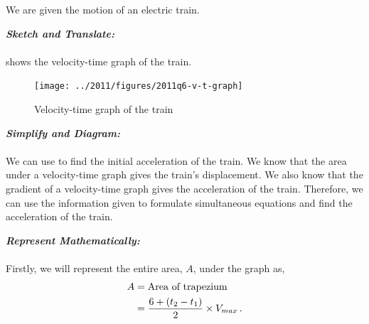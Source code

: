 %
%
%


\begin{subquestions}
	
\subquestion
We are given the motion of an electric train.

\begin{subsubquestions}
	
\subsubquestion

\textbf{\textit{Sketch and Translate:}} \\ \\
 shows the velocity-time graph of the train.
\begin{figure}[H]
	\begin{center}
		\texttt{[image: ../2011/figures/2011q6-v-t-graph]}
		\caption{\label{2011:q6:VTGraph} Velocity-time graph of the train}
	\end{center}
\end{figure}


\subsubquestion

\textbf{\textit{Simplify and Diagram:}} \\ \\
We can use  to find the initial acceleration of the train. We know that the area under a velocity-time graph gives the train's displacement. We also know that the gradient of a velocity-time graph gives the acceleration of the train. Therefore, we can use the information given to formulate simultaneous equations and find the acceleration of  the train.




\textbf{\textit{Represent Mathematically:}} \\ \\
Firstly, we will represent the entire area, $A$, under the graph as,
\begin{align}
	A & = \text{Area of trapezium} \nonumber \\
	  & = \frac{6 + (t_2-t_1)}{2}\times V_{max} \,. \label{2011:q6:AEqn1}
\end{align}   
	

\end{subsubquestions}
\end{subquestions}
